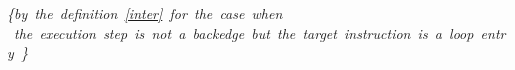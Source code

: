 \begin{enumerate}
\mbox{\rm \textit{\{by the definition  \ref{inter} for the case when}} \\
\mbox{\rm \textit{ the execution step is not a backedge but the target instruction is a loop entry \} } }\\

     
\end{enumerate}
